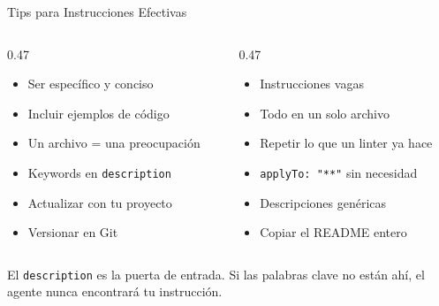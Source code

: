 \documentclass[aspectratio=169,11pt]{beamer}
\begin{document}
\begin{frame}{Tips para Instrucciones Efectivas}
  \begin{columns}[T]
    \begin{column}{0.47\textwidth}
      \begin{tcolorbox}[colback=ixtiGreen!5, colframe=ixtiGreen!70!black, title={\textcolor{white}{\faCheck\ Hacer}}, fonttitle=\bfseries]
        \small
        \begin{itemize}
          \item[\textcolor{ixtiGreen}{\faCheck}] Ser espec\'ifico y conciso
          \item[\textcolor{ixtiGreen}{\faCheck}] Incluir ejemplos de c\'odigo
          \item[\textcolor{ixtiGreen}{\faCheck}] Un archivo = una preocupaci\'on
          \item[\textcolor{ixtiGreen}{\faCheck}] Keywords en \texttt{description}
          \item[\textcolor{ixtiGreen}{\faCheck}] Actualizar con tu proyecto
          \item[\textcolor{ixtiGreen}{\faCheck}] Versionar en Git
        \end{itemize}
      \end{tcolorbox}
    \end{column}
    \begin{column}{0.47\textwidth}
      \begin{tcolorbox}[colback=red!3, colframe=red!40!black, title={\textcolor{white}{\faTimes\ Evitar}}, fonttitle=\bfseries]
        \small
        \begin{itemize}
          \item[\textcolor{red!60}{\faTimes}] Instrucciones vagas
          \item[\textcolor{red!60}{\faTimes}] Todo en un solo archivo
          \item[\textcolor{red!60}{\faTimes}] Repetir lo que un linter ya hace
          \item[\textcolor{red!60}{\faTimes}] \texttt{applyTo: "**"} sin necesidad
          \item[\textcolor{red!60}{\faTimes}] Descripciones gen\'ericas
          \item[\textcolor{red!60}{\faTimes}] Copiar el README entero
        \end{itemize}
      \end{tcolorbox}
    \end{column}
  \end{columns}

  \vspace{0.1em}
  \begin{quoteblock}[fontupper=\footnotesize\itshape\color{ixtiDark}, top=4pt, bottom=4pt]
    El \texttt{description} es la puerta de entrada. Si las palabras clave no est\'an ah\'i, el agente nunca encontrar\'a tu instrucci\'on.
  \end{quoteblock}
\end{frame}
\end{document}
